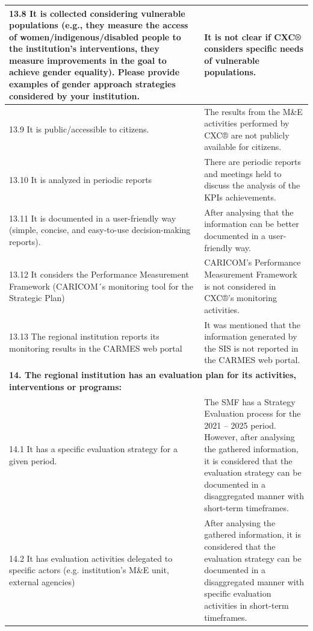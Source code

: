 \documentclass[
  10pt,
]{book}
\begin{document}
\begin{table}
\begin{tabular}[t]{l|l}
\hline
\hspace{1em}13.8 It is collected considering vulnerable populations (e.g., they measure the access of women/indigenous/disabled people to the institution’s interventions, they measure improvements in the goal to achieve gender equality). Please provide examples of gender approach strategies considered by your institution. & It is not clear if CXC® considers specific needs of vulnerable populations.\\
\hline
\hspace{1em}13.9 It is public/accessible to citizens. & The results from the M\&E activities performed by CXC® are not publicly available for citizens.\\
\hline
\hspace{1em}13.10 It is analyzed in periodic reports & There are periodic reports and meetings held to discuss the analysis of the KPIs achievements.\\
\hline
\hspace{1em}13.11 It is documented in a user-friendly way (simple, concise, and easy-to-use decision-making reports). & After analysing that the information can be better documented in a user-friendly way.\\
\hline
\hspace{1em}13.12 It considers the Performance Measurement Framework (CARICOM´s monitoring tool for the Strategic Plan) & CARICOM’s Performance Measurement Framework is not considered in CXC®’s monitoring activities.\\
\hline
\hspace{1em}13.13 The regional institution reports its monitoring results in the CARMES web portal & It was mentioned that the information generated by the SIS is not reported in the CARMES web portal.\\
\hline
\multicolumn{2}{l}{\textbf{14. The regional institution has an evaluation plan for its activities, interventions or programs:}}\\
\hline
\hspace{1em}14.1 It has a specific evaluation strategy for a given period. & The SMF has a Strategy Evaluation process for the 2021 – 2025 period. However, after analysing the gathered information, it is considered that the evaluation strategy can be documented in a disaggregated manner with short-term timeframes.\\
\hline
\hspace{1em}14.2 It has evaluation activities delegated to specific actors (e.g. institution's M\&E unit, external agencies) & After analysing the gathered information, it is considered that the evaluation strategy can be documented in a disaggregated manner with specific evaluation activities in short-term timeframes.\\

\end{tabular}
\end{table}
\end{document}
